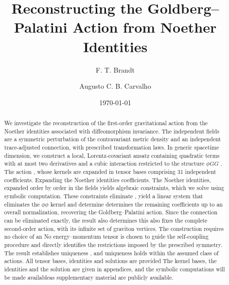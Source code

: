 \documentclass[prd,aps,preprint,superscriptaddress,nofootinbib,amsmath,amssymb,eqsecnum]{revtex4-2}
\providecommand{\DIFaddtex}[1]{{\protect\color{blue} \sf #1}} %
\providecommand{\DIFdeltex}[1]{{\protect\color{red} \scriptsize #1}} %
\providecommand{\DIFaddbegin}{} %
\providecommand{\DIFaddend}{} %
\providecommand{\DIFdelbegin}{} %
\providecommand{\DIFdelend}{} %
\providecommand{\DIFadd}[1]{\texorpdfstring{\DIFaddtex{#1}}{#1}} %
\providecommand{\DIFdel}[1]{\texorpdfstring{\DIFdeltex{#1}}{}} %
\begin{document}
\title{Reconstructing the Goldberg--Palatini Action from Noether Identities}

\author{F. T. Brandt}
\author{Augusto C. B. Carvalho}

\date{\today}

\begin{abstract}
We investigate the reconstruction of the first-order gravitational action from the Noether
identities associated with diffeomorphism invariance. The independent fields are a symmetric
perturbation of the contravariant metric density and an independent trace-adjusted
connection, with prescribed transformation laws. In generic spacetime dimension, we construct a local,
Lorentz-covariant ansatz containing quadratic terms with at most two derivatives and a cubic
interaction restricted to the structure $\phi GG$\DIFdelbegin \DIFdel{. The action }\DIFdelend \DIFaddbegin \DIFadd{, whose }\DIFaddend kernels are expanded in tensor bases
comprising 31 \DIFdelbegin \DIFdel{independent coefficients. Expanding the Noether identities}\DIFdelend \DIFaddbegin \DIFadd{coefficients. The Noether identities, expanded }\DIFaddend order by order in the fields\DIFdelbegin \DIFdel{yields algebraic constraints,
which we solve using symbolic computation. These
constraints eliminate }\DIFdelend \DIFaddbegin \DIFadd{,
yield a linear system that eliminates }\DIFaddend the $\phi\phi$ kernel and \DIFdelbegin \DIFdel{determine }\DIFdelend \DIFaddbegin \DIFadd{determines }\DIFaddend the remaining
coefficients up to an overall normalization, recovering the Goldberg--Palatini action. Since
the connection can be eliminated exactly, \DIFdelbegin \DIFdel{the result also determines }\DIFdelend \DIFaddbegin \DIFadd{this also fixes }\DIFaddend the complete second-order action,
with its infinite set of graviton vertices. \DIFdelbegin \DIFdel{The construction requires no
choice of an }\DIFdelend \DIFaddbegin \DIFadd{No }\DIFaddend energy--momentum tensor \DIFaddbegin \DIFadd{is chosen }\DIFaddend to guide the
self-coupling\DIFdelbegin \DIFdel{procedure and directly
identifies the restrictions imposed by the prescribed symmetry. The result establishes
uniqueness }\DIFdelend \DIFaddbegin \DIFadd{, and uniqueness holds }\DIFaddend within the assumed class of actions. \DIFdelbegin \DIFdel{All tensor bases,
identities and solutions are provided }\DIFdelend \DIFaddbegin \DIFadd{The kernel bases,
the identities and the solution are given }\DIFaddend in appendices, and the symbolic computations \DIFdelbegin \DIFdel{will be made availableas
supplementary material}\DIFdelend \DIFaddbegin \DIFadd{are
publicly available}\DIFaddend .
\end{abstract}
\end{document}
